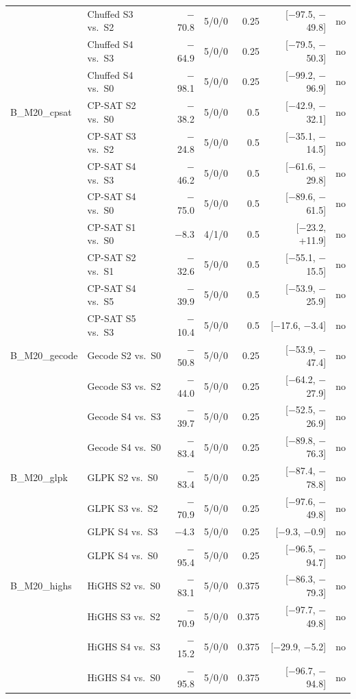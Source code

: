 \begin{longtable}{llrrrrl}
 & Chuffed S3 vs.\ S2 & $-$70.8 & 5/0/0 & 0.25 & [$-$97.5, $-$49.8] & no \\
 & Chuffed S4 vs.\ S3 & $-$64.9 & 5/0/0 & 0.25 & [$-$79.5, $-$50.3] & no \\
 & Chuffed S4 vs.\ S0 & $-$98.1 & 5/0/0 & 0.25 & [$-$99.2, $-$96.9] & no \\
B\_M20\_cpsat & CP-SAT S2 vs.\ S0 & $-$38.2 & 5/0/0 & 0.5 & [$-$42.9, $-$32.1] & no \\
 & CP-SAT S3 vs.\ S2 & $-$24.8 & 5/0/0 & 0.5 & [$-$35.1, $-$14.5] & no \\
 & CP-SAT S4 vs.\ S3 & $-$46.2 & 5/0/0 & 0.5 & [$-$61.6, $-$29.8] & no \\
 & CP-SAT S4 vs.\ S0 & $-$75.0 & 5/0/0 & 0.5 & [$-$89.6, $-$61.5] & no \\
 & CP-SAT S1 vs.\ S0 & $-$8.3 & 4/1/0 & 0.5 & [$-$23.2, +11.9] & no \\
 & CP-SAT S2 vs.\ S1 & $-$32.6 & 5/0/0 & 0.5 & [$-$55.1, $-$15.5] & no \\
 & CP-SAT S4 vs.\ S5 & $-$39.9 & 5/0/0 & 0.5 & [$-$53.9, $-$25.9] & no \\
 & CP-SAT S5 vs.\ S3 & $-$10.4 & 5/0/0 & 0.5 & [$-$17.6, $-$3.4] & no \\
B\_M20\_gecode & Gecode S2 vs.\ S0 & $-$50.8 & 5/0/0 & 0.25 & [$-$53.9, $-$47.4] & no \\
 & Gecode S3 vs.\ S2 & $-$44.0 & 5/0/0 & 0.25 & [$-$64.2, $-$27.9] & no \\
 & Gecode S4 vs.\ S3 & $-$39.7 & 5/0/0 & 0.25 & [$-$52.5, $-$26.9] & no \\
 & Gecode S4 vs.\ S0 & $-$83.4 & 5/0/0 & 0.25 & [$-$89.8, $-$76.3] & no \\
B\_M20\_glpk & GLPK S2 vs.\ S0 & $-$83.4 & 5/0/0 & 0.25 & [$-$87.4, $-$78.8] & no \\
 & GLPK S3 vs.\ S2 & $-$70.9 & 5/0/0 & 0.25 & [$-$97.6, $-$49.8] & no \\
 & GLPK S4 vs.\ S3 & $-$4.3 & 5/0/0 & 0.25 & [$-$9.3, $-$0.9] & no \\
 & GLPK S4 vs.\ S0 & $-$95.4 & 5/0/0 & 0.25 & [$-$96.5, $-$94.7] & no \\
B\_M20\_highs & HiGHS S2 vs.\ S0 & $-$83.1 & 5/0/0 & 0.375 & [$-$86.3, $-$79.3] & no \\
 & HiGHS S3 vs.\ S2 & $-$70.9 & 5/0/0 & 0.375 & [$-$97.7, $-$49.8] & no \\
 & HiGHS S4 vs.\ S3 & $-$15.2 & 5/0/0 & 0.375 & [$-$29.9, $-$5.2] & no \\
 & HiGHS S4 vs.\ S0 & $-$95.8 & 5/0/0 & 0.375 & [$-$96.7, $-$94.8] & no \\

\end{longtable}
